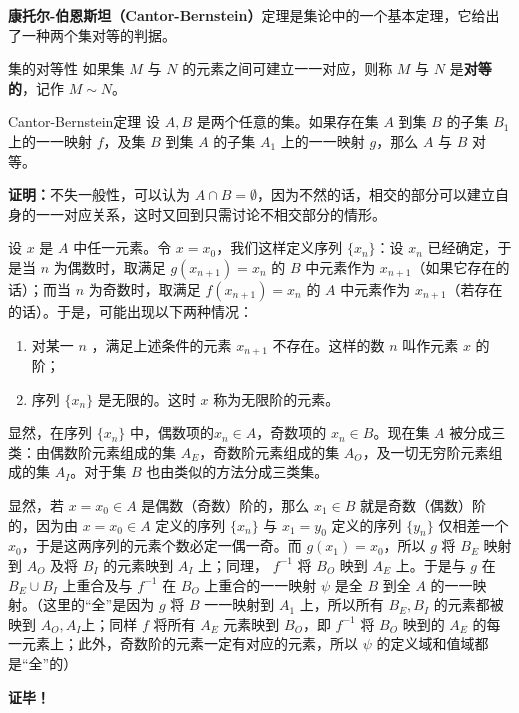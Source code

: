 
\textbf{康托尔-伯恩斯坦（Cantor-Bernstein）}定理是集论中的一个基本定理，它给出了一种两个集对等的判据。
\begin{definition}{集的对等性}
如果集 $M$ 与 $N$ 的元素之间可建立一一对应，则称 $M$ 与 $N$ 是\textbf{对等的}，记作 $M\sim N$。
\end{definition}
\begin{theorem}{Cantor-Bernstein定理}
设 $A,B$ 是两个任意的集。如果存在集 $A$ 到集 $B$ 的子集 $B_1$ 上的一一映射 $f$，及集 $B$ 到集 $A$ 的子集 $A_1$ 上的一一映射 $g$，那么 $A$ 与 $B$ 对等。
\end{theorem}
\textbf{证明：}不失一般性，可以认为 $A\cap B=\emptyset$，因为不然的话，相交的部分可以建立自身的一一对应关系，这时又回到只需讨论不相交部分的情形。

设 $x$ 是 $A$ 中任一元素。令 $x=x_0$，我们这样定义序列 $\{x_n\}$：设 $x_n$ 已经确定，于是当 $n$ 为偶数时，取满足 $g(x_{n+1})=x_n$ 的 $B$ 中元素作为 $x_{n+1}$（如果它存在的话）；而当 $n$ 为奇数时，取满足 $f(x_{n+1})=x_n$ 的 $A$ 中元素作为 $x_{n+1}$（若存在的话）。于是，可能出现以下两种情况：
\begin{enumerate}
\item 对某一 $n$ ，满足上述条件的元素 $x_{n+1}$ 不存在。这样的数 $n$ 叫作元素 $x$ 的阶；
\item 序列 $\{x_n\}$ 是无限的。这时 $x$ 称为无限阶的元素。
\end{enumerate}
显然，在序列 $\{x_n\}$ 中，偶数项的$x_n\in A$，奇数项的 $x_n\in B$。现在集 $A$ 被分成三类：由偶数阶元素组成的集 $A_E$，奇数阶元素组成的集 $A_O$，及一切无穷阶元素组成的集 $A_I$。对于集 $B$ 也由类似的方法分成三类集。

显然，若 $x=x_0\in A$ 是偶数（奇数）阶的，那么 $x_1\in B$ 就是奇数（偶数）阶的，因为由 $x=x_0\in A$ 定义的序列 $\{x_n\}$ 与 $x_1=y_0$ 定义的序列 $\{y_n\}$ 仅相差一个 $x_0$，于是这两序列的元素个数必定一偶一奇。而 $g(x_1)=x_0$，所以 $g$ 将 $B_E$ 映射到 $A_O$ 及将 $B_I$ 的元素映到 $A_I$ 上；同理， $f^{-1}$ 将 $B_O$ 映到 $A_E$ 上。于是与 $g$ 在 $B_E\cup B_I$ 上重合及与 $f^{-1}$ 在 $B_O$ 上重合的一一映射 $\psi$ 是全 $B$ 到全 $A$ 的一一映射。（这里的“全”是因为 $g$ 将 $B$ 一一映射到 $A_1$ 上，所以所有 $B_E,B_I$ 的元素都被映到 $A_O,A_I$上；同样 $f$ 将所有 $A_E$ 元素映到 $B_O$，即 $f^{-1}$ 将 $B_O$ 映到的 $A_E$ 的每一元素上；此外，奇数阶的元素一定有对应的元素，所以 $\psi$ 的定义域和值域都是“全”的）

\textbf{证毕！}